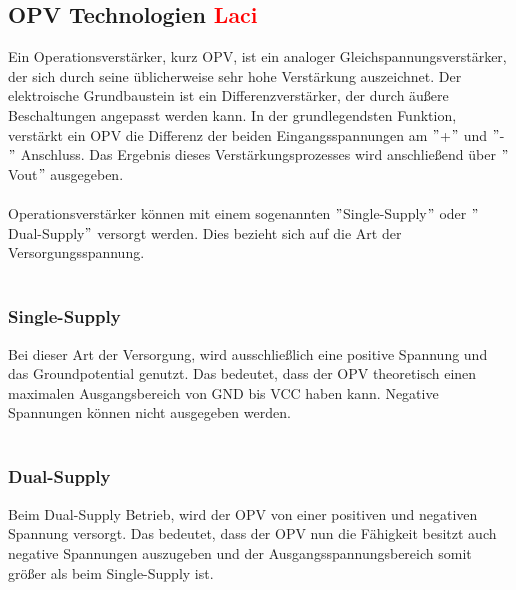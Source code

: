 \documentclass[titlepage,12pt,twoside]{article}
\begin{document}
\subsection{OPV Technologien \textcolor{red}{Laci}}
\label{chap:OPV Technologien}
Ein Operationsverstärker, kurz OPV, ist ein analoger Gleichspannungsverstärker, der sich durch seine üblicherweise sehr hohe 
Verstärkung auszeichnet. Der elektroische Grundbaustein ist ein Differenzverstärker, der durch äußere Beschaltungen angepasst werden kann.
In der grundlegendsten Funktion, verstärkt ein OPV die Differenz der beiden Eingangsspannungen am $"$+$"$ und $"$-$"$ Anschluss. Das Ergebnis
dieses Verstärkungsprozesses wird anschließend über $"$Vout$"$ ausgegeben. \\
\\
Operationsverstärker können mit einem sogenannten $"$Single-Supply$"$ oder $"$Dual-Supply$"$ versorgt werden. Dies bezieht sich auf
die Art der Versorgungsspannung. \\
\\
\subsubsection{Single-Supply}
Bei dieser Art der Versorgung, wird ausschließlich eine positive Spannung und das Groundpotential genutzt. Das bedeutet, dass der OPV
theoretisch einen maximalen Ausgangsbereich von GND bis VCC haben kann. Negative Spannungen können nicht ausgegeben werden. \\
\\

\subsubsection{Dual-Supply}
Beim Dual-Supply Betrieb, wird der OPV von einer positiven und negativen Spannung versorgt. Das bedeutet, dass der OPV nun die Fähigkeit
besitzt auch negative Spannungen auszugeben und der Ausgangsspannungsbereich somit größer als beim Single-Supply ist.
\end{document}
